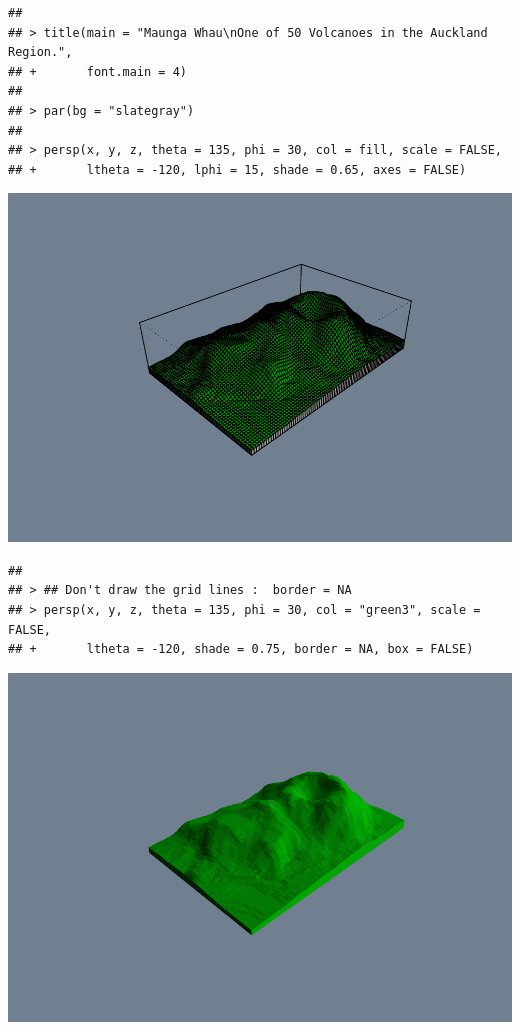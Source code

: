 \documentclass[
]{book}
\begin{document}
\begin{verbatim}
## 
## > title(main = "Maunga Whau\nOne of 50 Volcanoes in the Auckland Region.",
## +       font.main = 4)
## 
## > par(bg = "slategray")
## 
## > persp(x, y, z, theta = 135, phi = 30, col = fill, scale = FALSE,
## +       ltheta = -120, lphi = 15, shade = 0.65, axes = FALSE)
\end{verbatim}

\includegraphics{TudodoR_files/figure-latex/unnamed-chunk-146-5.pdf}

\begin{verbatim}
## 
## > ## Don't draw the grid lines :  border = NA
## > persp(x, y, z, theta = 135, phi = 30, col = "green3", scale = FALSE,
## +       ltheta = -120, shade = 0.75, border = NA, box = FALSE)
\end{verbatim}

\includegraphics{TudodoR_files/figure-latex/unnamed-chunk-146-6.pdf}
\end{document}
